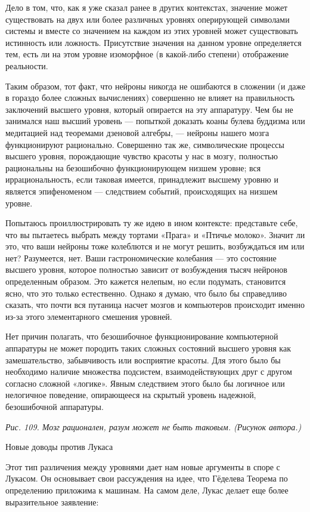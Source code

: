 \documentclass[../main.tex]{subfiles}
\begin{document}
Дело в том, что, как я уже сказал ранее в других контекстах, значение может существовать на двух или более различных уровнях оперирующей символами системы и вместе со значением на каждом из этих уровней может существовать истинность или ложность. Присутствие значения на данном уровне определяется тем, есть ли на этом уровне изоморфное (в какой-либо степени) отображение реальности.

Таким образом, тот факт, что нейроны никогда не ошибаются в сложении (и даже в гораздо более сложных вычислениях) совершенно не влияет на правильность заключений высшего уровня, который опирается на эту аппаратуру. Чем бы не занимался наш высший уровень --- попыткой доказать коаны булева буддизма или медитацией над теоремами дзеновой алгебры, --- нейроны нашего мозга функционируют рационально. Совершенно так же, символические процессы высшего уровня, порождающие чувство красоты у нас в мозгу, полностью рациональны на безошибочно функционирующем низшем уровне; вся иррациональность, если таковая имеется, принадлежит высшему уровню и является эпифеноменом --- следствием событий, происходящих на низшем уровне.

Попытаюсь проиллюстрировать ту же идею в ином контексте: представьте себе, что вы пытаетесь выбрать между тортами «Прага» и «Птичье молоко». Значит ли это, что ваши нейроны тоже колеблются и не могут решить, возбуждаться им или нет? Разумеется, нет. Ваши гастрономические колебания --- это состояние высшего уровня, которое полностью зависит от возбуждения тысяч нейронов определенным образом. Это кажется нелепым, но если подумать, становится ясно, что это только естественно. Однако я думаю, что было бы справедливо сказать, что почти вся путаница насчет мозгов и компьютеров происходит именно из-за этого элементарного смешения уровней.

Нет причин полагать, что безошибочное функционирование компьютерной аппаратуры не может породить таких сложных состояний высшего уровня как замешательство, забывчивость или восприятие красоты. Для этого было бы необходимо наличие множества подсистем, взаимодействующих друг с другом согласно сложной «логике». Явным следствием этого было бы логичное или нелогичное поведение, опирающееся на скрытый уровень надежной, безошибочной аппаратуры.

\emph{Рис. 109. Мозг рационален, разум может не быть таковым. (Рисунок автора.)}

Новые доводы против Лукаса

Этот тип различения между уровнями дает нам новые аргументы в споре с Лукасом. Он основывает свои рассуждения на идее, что Гёделева Теорема по определению приложима к машинам. На самом деле, Лукас делает еще более выразительное заявление:
\end{document}
